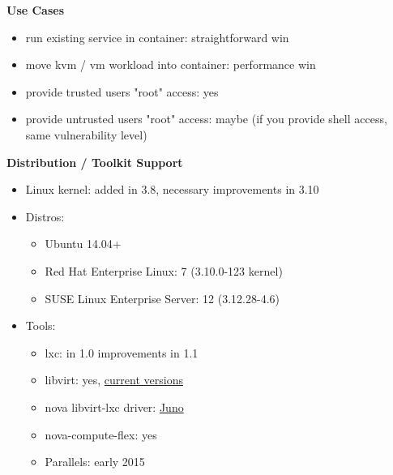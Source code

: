 \documentclass{beamer}
\begin{document}
\begin{frame}
\textbf{Use Cases}
  \begin{itemize}
  \item run existing service in container: straightforward win
  \item move kvm / vm workload into container: performance win
  \item provide trusted users "root" access: yes
  \item provide untrusted users "root" access: maybe (if you provide shell access, same vulnerability level)
  \end{itemize}
\end{frame}

\begin{frame}
\textbf{Distribution / Toolkit Support}
\begin{itemize}
\item Linux kernel: added in 3.8, necessary improvements in 3.10
\item Distros:
  \begin{itemize}
  \item Ubuntu 14.04+
  \item Red Hat Enterprise Linux: 7 (3.10.0-123 kernel)
  \item SUSE Linux Enterprise Server: 12 (3.12.28-4.6)
  \end{itemize}
\item Tools:
  \begin{itemize}
    \item lxc: in 1.0 improvements in 1.1
    \item libvirt: yes, \href{http://libvirt.org/git/?p=libvirt.git;a=commit;h=6c30ea2c353aa664397774ee42c425236371788b}{current versions}
    \item nova libvirt-lxc driver: \href{https://blueprints.launchpad.net/nova/+spec/libvirt-lxc-user-namespaces}{Juno}
    \item nova-compute-flex: yes
    \item Parallels: early 2015
  \end{itemize}
\end{itemize}
\end{frame}
\end{document}
